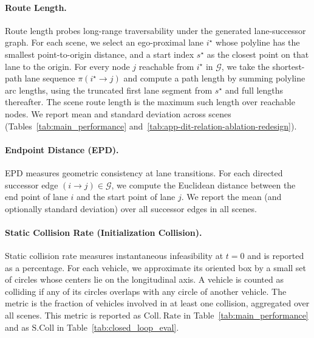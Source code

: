 \documentclass{article}
\theoremstyle{plain}
\theoremstyle{definition}
\theoremstyle{remark}
\begin{document}
\paragraph{Route Length.}
Route length probes long-range traversability under the generated lane-successor graph.
For each scene, we select an ego-proximal lane \(i^{\star}\) whose polyline has the smallest point-to-origin distance, and a
start index \(s^{\star}\) as the closest point on that lane to the origin.
For every node \(j\) reachable from \(i^{\star}\) in \(\mathcal{G}\), we take the shortest-path lane sequence
\(\pi(i^{\star}\!\rightarrow\! j)\) and compute a path length by summing polyline arc lengths, using the truncated first lane segment
from \(s^{\star}\) and full lengths thereafter. The scene route length is the maximum such length over reachable nodes.
We report mean and standard deviation across scenes (Tables~\ref{tab:main_performance} and~\ref{tab:app-dit-relation-ablation-redesign}).

\paragraph{Endpoint Distance (EPD).}
EPD measures geometric consistency at lane transitions.
For each directed successor edge \((i\rightarrow j)\in\mathcal{G}\), we compute the Euclidean distance between the end point of lane \(i\)
and the start point of lane \(j\).
We report the mean (and optionally standard deviation) over all successor edges in all scenes.

\paragraph{Static Collision Rate (Initialization Collision).}
Static collision rate measures instantaneous infeasibility at \(t=0\) and is reported as a percentage.
For each vehicle, we approximate its oriented box by a small set of circles whose centers lie on the longitudinal axis.
A vehicle is counted as colliding if any of its circles overlaps with any circle of another vehicle.
The metric is the fraction of vehicles involved in at least one collision, aggregated over all scenes.
This metric is reported as \(\mathrm{Coll.\ Rate}\) in Table~\ref{tab:main_performance} and as \(\mathrm{S.Coll}\) in Table~\ref{tab:closed_loop_eval}.
\end{document}
